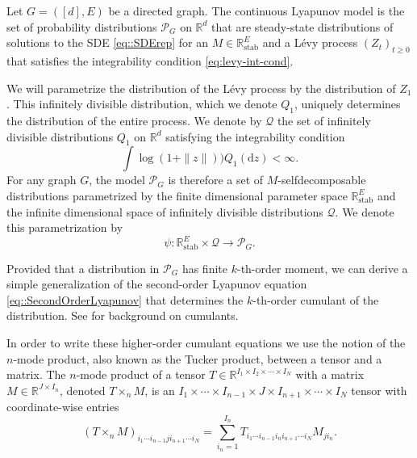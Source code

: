 \documentclass{biometrika}
\begin{document}
\begin{definition}
    \label{def::ContLyapunovLevy}
    Let $G = ([d],E)$ be a directed graph. The continuous Lyapunov model is the set of probability distributions $\mathcal{P}_G$ on $\mathbb{R}^d$ that are steady-state distributions of solutions to the SDE \eqref{eq::SDErep} for an $M \in \mathbb{R}^{E}_{\mathrm{stab}}$ and a Lévy process $(Z_t)_{t \geq 0}$ that satisfies the integrability condition \eqref{eq:levy-int-cond}.
\end{definition}


We will parametrize the distribution of the Lévy process by the distribution 
of $Z_1$. This infinitely divisible distribution, which we denote $Q_1$, 
uniquely determines the distribution of the entire process. We denote by 
$\mathcal{Q}$ the set of infinitely divisible distributions $Q_1$ on $\mathbb{R}^d$ satisfying 
the integrability condition
\begin{equation}
	\label{eq:levy-int-cond2}
	\int \log(1 + \|z\|)) Q_1(\mathrm{d}z) < \infty.
\end{equation}
For any graph $G$, the model $\mathcal{P}_G$ is 
therefore a set of $M$-selfdecomposable distributions parametrized by the finite 
dimensional parameter space $\mathbb{R}^{E}_{\mathrm{stab}}$ and the infinite dimensional 
space of infinitely divisible distributions $\mathcal{Q}$. We denote this parametrization by 
$$
    \psi : \mathbb{R}^{E}_{\mathrm{stab}} \times \mathcal{Q} \to \mathcal{P}_G.
$$

Provided that a distribution in $\mathcal{P}_G$ has finite $k$-th-order moment, we can
derive a simple generalization of the second-order Lyapunov equation \eqref{eq::SecondOrderLyapunov} that determines the $k$-th-order cumulant of the 
distribution. See \cite{mccullagh2018tensor} for background on cumulants. 


In order to write these higher-order cumulant equations we use the notion of the $n$-mode product, also known as the Tucker product, between a tensor and a matrix. The $n$-mode product of a tensor $T \in \mathbb{R}^{I_1 \times I_2 \times \cdots \times I_N}$ with a matrix $M \in \mathbb{R}^{J \times I_n}$, denoted $T \times_n M$, 
is an $I_1 \times \cdots \times I_{n-1} \times J \times I_{n+1} \times \cdots \times I_N$ tensor with coordinate-wise entries 
\begin{equation*}
    (T \times_n M)_{i_1 \cdots i_{n-1} j i_{n+1} \cdots i_N} = \sum_{i_n = 1}^{I_n} T_{i_1 \cdots i_{n-1} i_n i_{n+1} \cdots i_{N}} M_{ji_n}.
\end{equation*}
\end{document}
